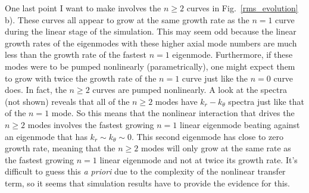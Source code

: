 One last point I want to make involves the $n \ge 2$ curves in Fig.~\ref{rms_evolution} b). These curves all appear to grow at the same growth rate as the $n=1$ curve during the linear
stage of the simulation. This may seem odd because the linear growth rates of the eigenmodes with these higher axial mode numbers are much less than the growth rate of the fastest
$n=1$ eigenmode. Furthermore, if these modes were to be pumped nonlinearly (parametrically), one might expect them to grow with twice the growth rate of the $n=1$ curve just like the
$n=0$ curve does. In fact, the $n \ge 2$ curves are pumped nonlinearly. A look at the spectra (not shown) reveals that all of the $n \ge 2$ modes have $k_r-k_\theta$ spectra
just like that of the $n=1$ mode. So this means that the nonlinear interaction that drives the $n \ge 2$ modes involves the fastest growing $n=1$ linear eigenmode beating against an eigenmode
that has $k_r \sim k_\theta \sim 0$. This second eigenmode has close to zero growth rate, meaning that the $n \ge 2$ modes will only grow at the same rate as the fastest growing
$n=1$ linear eigenmode and not at twice its growth rate. It's difficult to guess this \emph{a priori} due to the complexity of the nonlinear transfer term, so it seems that simulation
results have to provide the evidence for this.
